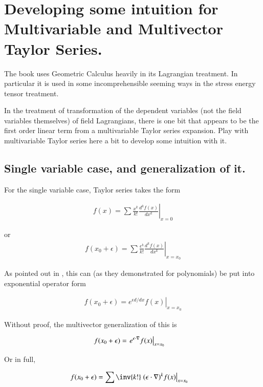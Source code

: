 \chapter{Developing some intuition for Multivariable and Multivector Taylor Series.}\label{chap:PJmultiTaylors}
\date{April 28, 2009.  multivectorTaylors.tex}

The book \cite{doran2003gap} uses Geometric Calculus heavily in its 
Lagrangian treatment.  In particular it is used in some incomprehensible seeming ways in the 
stress energy tensor treatment.

In the treatment of transformation of the dependent variables (not the field
variables themselves) of field Lagrangians, there is one bit that
appears to be the first order linear term from a multivariable Taylor
series expansion.  Play with multivariable Taylor series here a bit
to develop some intuition with it.

\section{Single variable case, and generalization of it. }

For the single variable case, Taylor series takes the form

\begin{align}
f(x) = \sum \frac{x^k}{k!} \left. \frac{d^k f(x)}{dx^k} \right\vert_{x=0}
\end{align}

or
\begin{align}
f(x_0 + \epsilon) = \sum \frac{\epsilon^k}{k!} \left. \frac{d^k f(x)}{dx^k} \right\vert_{x=x_0}
\end{align}

As pointed out in \cite{byron1992mca}, this can (as they demonstrated for polynomials) be put into exponential 
operator form

\begin{align}
f(x_0 + \epsilon) = \left. e^{\epsilon d/dx} f(x) \right\vert_{x=x_0}
\end{align}

Without proof, the multivector generalization of this is

\begin{align}\label{eqn:multivector_taylors:taylorsExponential}
f(x_0 + \epsilon) 
&= \left. e^{\epsilon \cdot \nabla} f(x) \right\vert_{x=x_0} 
\end{align}

Or in full,

\begin{align}\label{eqn:multivector_taylors:taylorMulti}
f(x_0 + \epsilon) 
&= \sum \inv{k!} \left. {(\epsilon \cdot \grad)^k} f(x) \right\vert_{x=x_0}
\end{align}

